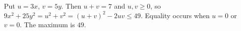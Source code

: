Put $u=3x$, $v=5y$. Then $u+v=7$ and $u,v\ge 0$, so $9x^2+25y^2=u^2+v^2=(u+v)^2-2uv\le 49$. Equality occurs when $u=0$ or $v=0$. The maximum is $\boxed{49}$.
